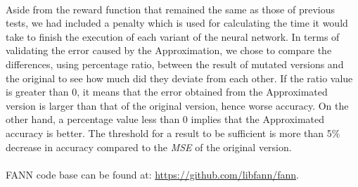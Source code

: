 ~\\
Aside from the reward function that remained the same as those of previous tests, we had included a penalty which is used for calculating the time it would take to finish the execution of each variant of the neural network. In terms of validating the error caused by the Approximation, we chose to compare the differences, using percentage ratio, between the result of mutated versions and the original to see how much did they deviate from each other. If the ratio value is greater than 0, it means that the error obtained from the Approximated version is larger than that of the original version, hence worse accuracy. On the other hand, a percentage value less than 0 implies that the Approximated accuracy is better. The threshold for a result to be sufficient is more than 5\% decrease in accuracy compared to the \textit{MSE} of the original version.\\
~\\ 
FANN code base can be found at: \url{https://github.com/libfann/fann}.\\